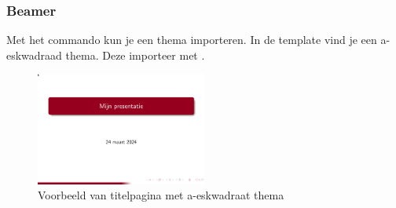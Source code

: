 \begin{frame}[fragile=singleslide]
	\frametitle{Beamer}
	Met het commando \texttt{\usetheme{}} kun je een thema importeren. In de template vind je
	een a-eskwadraad thema. Deze importeer met \texttt{}.

	\begin{figure}
		\includegraphics[width=0.5\textwidth]{a-esTheme.png}
		\caption{Voorbeeld van titelpagina met a-eskwadraat thema}
	\end{figure}
\end{frame}
